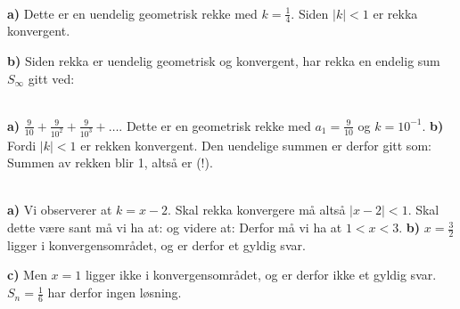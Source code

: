 \newpage
{}\\
\textbf{a)} Dette er en uendelig geometrisk rekke med $ k=\frac{1}{4} $. Siden $ |k|<1 $ er rekka konvergent.

\textbf{b)} Siden rekka er uendelig geometrisk og konvergent, har rekka en endelig sum $ S_\infty $ gitt ved:

\begin{comment}
	\opr{stav}\\
Dette blir en uendelig geometrisk rekke på formen:
\[ 1+\frac{1}{10}+\frac{1}{100}+... \]
Siden $ k=\frac{1}{10} $ er $ |k|<1 $ og derfor er rekka konvergent. Summen $ S_\infty $ er da gitt som:
\alg{
S_\infty&=\frac{a_1}{1-k} \\
&= \frac{1}{1-\frac{1}{10}} \\
&= \frac{1}{\frac{9}{10}} \br
&= \frac{10}{9}
}
Altså blir lengden $ \frac{10}{9} $ meter.
\end{comment}
 \\
\textbf{a)} $ {\frac{9}{10}+\frac{9}{10^2}+\frac{9}{10^3}+\ldots} $. Dette er en geometrisk rekke med $ {a_1 = \frac{9}{10}} $ og $ k=10^{-1} $.
\textbf{b)} Fordi $ {|k|<1 }$ er rekken konvergent. Den uendelige summen er derfor gitt som:
Summen av rekken blir 1, altså er  (!).

 \\
\textbf{a)} Vi observerer at ${ k=x-2} $. Skal rekka konvergere må altså $ {|x-2|<1} $. Skal dette være sant må vi ha at:
og videre at:
Derfor må vi ha at $ {1<x<3} $.
\newpage
\textbf{b)} 
$  {x=\frac{3}{2}} $ ligger i konvergensområdet, og er derfor et gyldig svar.

\textbf{c)} 
Men $  {x=1} $ ligger ikke i konvergensområdet, og er derfor ikke et gyldig svar. $ S_n=\frac{1}{6} $ har derfor ingen løsning.

